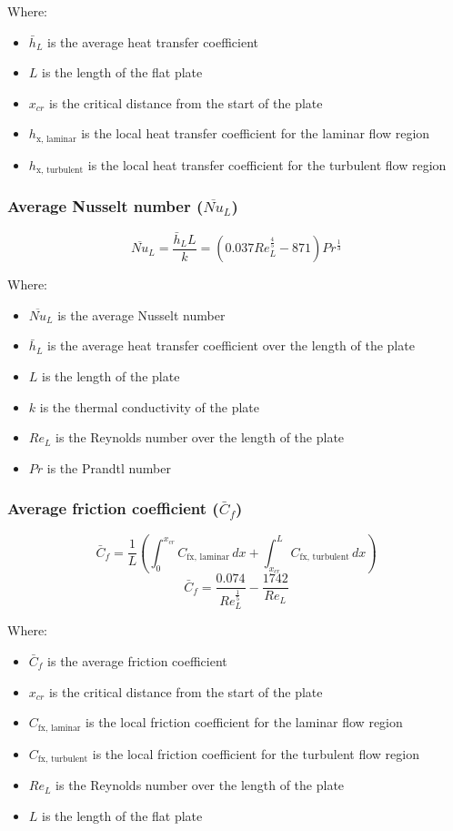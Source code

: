 \documentclass[11pt]{article}
\begin{document}
Where:
\begin{itemize}
\item \(\bar{h}_L\) is the average heat transfer coefficient
\item \(L\) is the length of the flat plate
\item \(x_{cr}\) is the critical distance from the start of the plate
\item \(h_{\text{x, laminar}}\) is the local heat transfer coefficient for the laminar flow region
\item \(h_{\text{x, turbulent}}\) is the local heat transfer coefficient for the turbulent flow region
\end{itemize}

\subsubsection{Average Nusselt number (\(\overline{Nu}_L\))}
\label{sec:org7346e19}
\[\overline{Nu}_L = \frac{\bar{h}_L L}{k} = (0.037 Re_L^ \frac{4}{5} - 871) Pr^{\frac{1}{3}}\]

Where:
\begin{itemize}
\item \(\overline{Nu}_L\) is the average Nusselt number
\item \(\bar{h}_L\) is the average heat transfer coefficient over the length of the plate
\item \(L\) is the length of the plate
\item \(k\) is the thermal conductivity of the plate
\item \(Re_L\) is the Reynolds number over the length of the plate
\item \(Pr\) is the Prandtl number
\end{itemize}

 \newpage

\subsubsection{Average friction coefficient (\(\bar{C}_f\))}
\label{sec:org53aa932}
\[\bar{C}_f = \frac{1}{L} \left(\int_0^{x_{cr}} C_{\text{fx, laminar}} \, dx + \int_{x_{cr}}^L C_{\text{fx, turbulent}} \, dx \right)\]
\[\bar{C}_f = \frac{0.074}{Re_L^{\frac{1}{5}}} - \frac{1742}{Re_L}\]

Where:
\begin{itemize}
\item \(\bar{C}_f\) is the average friction coefficient
\item \(x_{cr}\) is the critical distance from the start of the plate
\item \(C_{\text{fx, laminar}}\) is the local friction coefficient for the laminar flow region
\item \(C_{\text{fx, turbulent}}\) is the local friction coefficient for the turbulent flow region
\item \(Re_L\) is the Reynolds number over the length of the plate
\item \(L\) is the length of the flat plate
\end{itemize}
\end{document}
